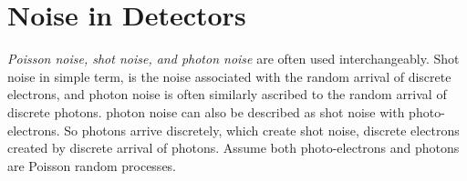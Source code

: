 \chapter{Noise in Detectors}
\textit{Poisson noise, shot noise, and photon noise} are often used interchangeably.  Shot noise in simple term, is the noise associated with the random arrival of discrete electrons, and photon noise is often similarly ascribed to the random arrival of discrete photons.  photon noise can also be described as shot noise with photo-electrons.  So photons arrive discretely, which create shot noise, discrete electrons created by discrete arrival of photons.  Assume both photo-electrons and photons are Poisson random processes.
